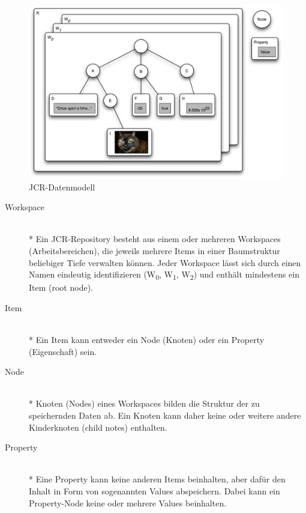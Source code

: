 \begin{figure}[!h]
\begin{center}
\includegraphics[scale=0.4]{images/repository/repository_diagramm.png}
\caption{JCR-Datenmodell}
\label{jcrdatenmodell}
\end{center}
\end{figure}



\begin{description}
\item[Workspace]\mbox{~}\\*
Ein JCR-Repository besteht aus einem oder mehreren Workspaces (Arbeitsbereichen), die jeweils mehrere Items in einer Baumstruktur beliebiger Tiefe verwalten können. Jeder Workspace lässt sich durch einen Namen eindeutig identifizieren (W\textsubscript{0}, W\textsubscript{1}, W\textsubscript{2}) und enthält mindestens ein Item (root node).
\item[Item]\mbox{~}\\*
Ein Item kann entweder ein Node (Knoten) oder ein Property (Eigenschaft) sein.
\item[Node]\mbox{~}\\*
Knoten (Nodes) eines Workspaces bilden die Struktur der zu speichernden Daten ab.
Ein Knoten kann daher keine oder weitere andere Kinderknoten (child notes) enthalten.
\item[Property]\mbox{~}\\*
Eine Property kann keine anderen Items beinhalten, aber dafür den Inhalt in Form von sogenannten Values abspeichern. Dabei kann ein Property-Node keine oder mehrere Values beinhalten.
\end{description}




